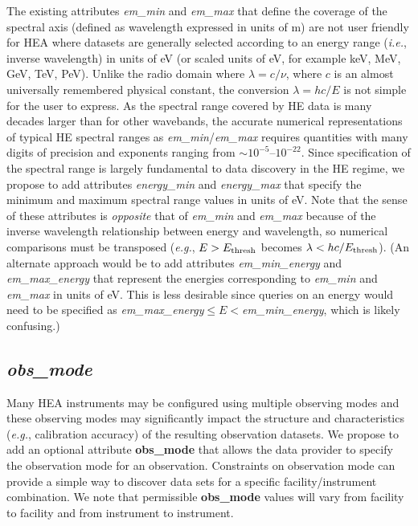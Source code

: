 \documentclass[11pt,a4paper]{ivoa}
\begin{document}
The existing attributes {\em em\_min\/} and {\em em\_max\/} that define the coverage of the spectral axis (defined as wavelength expressed in units of m) are not user friendly for HEA where datasets are generally selected according to an energy range ({\em i.e.\/}, inverse wavelength) in units of eV (or scaled units of eV, for example keV, MeV, GeV, TeV, PeV).  Unlike the radio domain where $\lambda = c/\nu$, where $c$ is an almost universally remembered physical constant, the conversion $\lambda = hc/E$ is not simple for the user to express.  As the spectral range covered by HE data is many decades larger than for other wavebands, the accurate numerical representations of typical HE spectral ranges as {\em em\_min\/}/{\em em\_max\/} requires quantities with many digits of precision and exponents ranging from $\sim\!10^{-5}$--$10^{-22}$.  Since specification of the spectral range is largely fundamental to data discovery in the HE regime, we propose to add attributes {\em energy\_min\/} and {\em energy\_max\/} that specify the minimum and maximum spectral range values in units of eV.  Note that the sense of these attributes is {\em opposite\/} that of {\em em\_min\/} and {\em em\_max\/} because of the inverse wavelength relationship between energy and wavelength, so numerical comparisons must be transposed ({\em e.g.\/}, $E>E_{\rm thresh}$ becomes $\lambda<hc/E_{\rm thresh}$).  (An alternate approach would be to add attributes {\em em\_min\_energy\/} and {\em em\_max\_energy\/} that represent the energies corresponding to {\em em\_min\/} and {\em em\_max\/} in units of eV.  This is less desirable since queries on an energy would need to be specified as {\em em\_max\_energy\/}${}\leq E <{}${\em em\_min\_energy\/}, which is likely confusing.)

\subsection{{\em obs\_mode}}

Many HEA instruments may be configured using multiple observing modes and these observing modes may significantly impact the structure and characteristics ({\em e.g.\/}, calibration accuracy) of the resulting observation datasets.  We propose to add an optional attribute {\bf obs\_mode} that allows the data provider to specify the observation mode for an observation.  Constraints on observation mode can provide a simple way to discover data sets for a specific facility/instrument combination.  We note that permissible {\bf obs\_mode} values will vary from facility to facility and from instrument to instrument.
\end{document}
